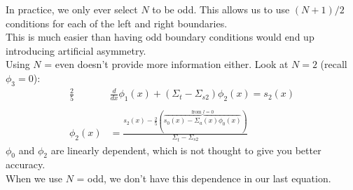 \documentclass[12pt]{article}
\begin{document}
In practice, we only ever select $N$ to be odd. This allows us to use $(N+1)/2$ conditions for each of the left and right boundaries. \\
This is much easier than having odd boundary conditions would end up introducing artificial asymmetry. \\
Using $N$ = even doesn't provide more information either. Look at $N=2$ (recall $\phi_3 = 0$):
\begin{align*}
\frac{2}{5}&\frac{d}{dx}\phi_1(x) +(\Sigma_t - \Sigma_{s2})\phi_2(x) = s_2(x)\\
&\\
\phi_2(x) &= \frac{s_2(x) - \frac{2}{5}(\overbrace{s_0(x) - \Sigma_a(x)\phi_0(x)}^{\text{from }l=0})}{\Sigma_t - \Sigma_{s2}}
\end{align*}
$\phi_0$ and $\phi_2$ are linearly dependent, which is not thought to give you better accuracy.\\
When we use $N$ = odd, we don't have this dependence in our last equation. 
\end{document}
